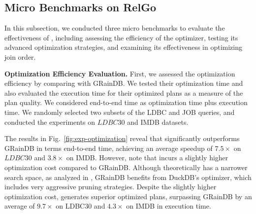 
\subsection{Micro Benchmarks on RelGo}
\label{sec:experiment-opt}
In this subsection, we conducted three micro benchmarks to evaluate the effectiveness of \name,
including assessing the efficiency of the optimizer, testing its advanced optimization strategies, and examining its effectiveness in optimizing join order.

\noindent\textbf{Optimization Efficiency Evaluation.}
First, we assessed the optimization efficiency by comparing \name with GRainDB\cite{graindb}.
We tested their optimization time
and also evaluated the execution time for their optimized plans as a measure of the plan quality.
We considered end-to-end time as optimization time plus execution time.
We randomly selected two subsets of the LDBC and JOB queries, and conducted the experiments on $LDBC30$ and IMDB datasets. %

The results in Fig.~\ref{fig:exp-optimization} reveal that \name significantly outperforms GRainDB in terms end-to-end time, achieving an average speedup of $7.5\times$ on $LDBC30$ and $3.8\times$ on IMDB.
However, note that \name incurs a slightly higher optimization cost compared to GRainDB. Although \name theoretically has a narrower search space, as analyzed in , GRainDB benefits from DuckDB's optimizer, which includes very aggressive pruning strategies.
Despite the slightly higher optimization cost, \name generates superior optimized plans, surpassing GRainDB by an average of $9.7\times$ on LDBC30 and $4.3\times$ on IMDB in execution time.



